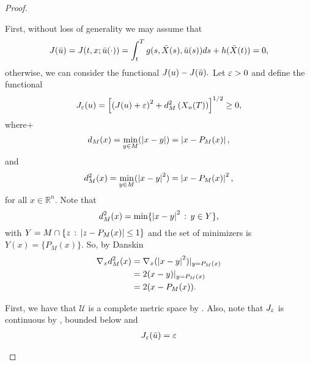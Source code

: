 \begin{proof}
    \begin{asparaenum}
        \item
        First, without loss of generality we may assume that 
        $$
            J(\bar{u}) = J(t,x; \Bar{u}(\cdot)) = \int_{t}^{T} g(s, \Bar{X}(s), \Bar{u}(s)) ds %
                + h(\Bar{X}(t)) = 0,
        $$
        otherwise, we can consider the functional 
        $
             J(u) -  J(\Bar{u}).
        $
        Let $\varepsilon >0$ and define the functional
        \begin{equation}
            J_{\veps}(u) = %
                \left[
                    \left( J(u) + \veps \right)^{2}
                    + 
                    d_{M}^2\left(X_{u}(T)\right) 
                \right]^{1/2} \geq 0,
        \end{equation}
        where+
        \begin{equation*}
            d_{M}(x) = \min_{y\in M}(\left\lvert x-y\right\rvert) = \left\lvert x - P_{M}(x)\right\rvert,
        \end{equation*}
        and
        \begin{equation*}
            d_{M}^2(x) = \min_{y\in M}(\left\lvert x-y\right\rvert^2) = \left\lvert x - P_{M}(x)\right\rvert^2,
        \end{equation*}
        for all $x \in \mathbb{R}^{n}$. Note that
        \begin{equation*}
             d_{M}^2(x) = \min\{\left\lvert x-y\right\rvert^2 \,:\, y\in Y\},
        \end{equation*}
        with $Y = M \cap \{z \, :\, \left\lvert z-P_M(x)\right\rvert \leq 1 \}$ and the set of
        minimizers is $Y(x) = \{P_{M}(x)\}$. So, by Danskin 
        \begin{align*}
            \nabla_x d_M^2(x) &= \nabla_x (\left\lvert x-y\right\rvert^2) \vert_{y = P_M(x)} \\
                &= 2(x-y)\vert_{y = P_M(x)} \\
                &= 2(x-P_M(x)).
        \end{align*}
        \item
        First, we have that $\mathcal{U}$ is a complete metric space by
        . Also, note that $J_{\varepsilon}$ is continuous by
        , bounded 
        below and
        \begin{align*}
            J_{\veps}(\Bar{u}) &= \veps       \\ 

\end{align*}
\end{asparaenum}
\end{proof}
